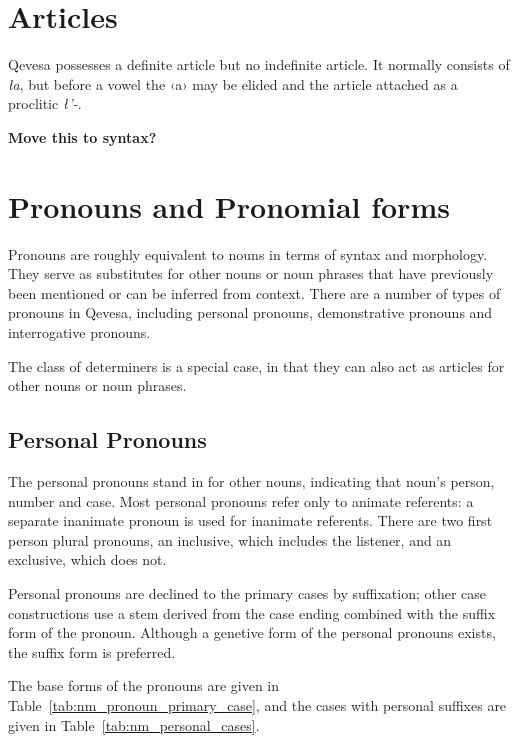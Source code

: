 \documentclass[grammar]{subfiles}
\begin{document}
  \section{Articles}
  \label{sec:nm_articles}

  Qevesa possesses a definite article but no indefinite article. It normally consists of \textit{ła}, but before a vowel the ‹a› may be elided and the article attached as a proclitic \textit{ł’-}. \ToBeWritten

  \textbf{Move this to syntax?}

  \section{Pronouns and Pronomial forms}
  \label{sec:nm_pronouns}

  Pronouns are roughly equivalent to nouns in terms of syntax and morphology. They serve as substitutes for other nouns or noun phrases that have previously been mentioned or can be inferred from context. There are a number of types of pronouns in Qevesa, including personal pronouns, demonstrative pronouns and interrogative pronouns.

  The class of determiners is a special case, in that they can also act as articles for other nouns or noun phrases.

  \subsection{Personal Pronouns}
  \label{ssec:nm_personal_pronouns}

  The personal pronouns stand in for other nouns, indicating that noun's person, number and case. Most personal pronouns refer only to animate referents: a separate inanimate pronoun is used for inanimate referents. There are two first person plural pronouns, an inclusive, which includes the listener, and an exclusive, which does not. 

  Personal pronouns are declined to the primary cases by suffixation; other case constructions use a stem derived from the case ending combined with the suffix form of the pronoun. Although a genetive form of the personal pronouns exists, the suffix form is preferred. 

  The base forms of the pronouns are given in Table~\ref{tab:nm_pronoun_primary_case}, and the cases with personal suffixes are given in Table~\ref{tab:nm_personal_cases}.
\end{document}
